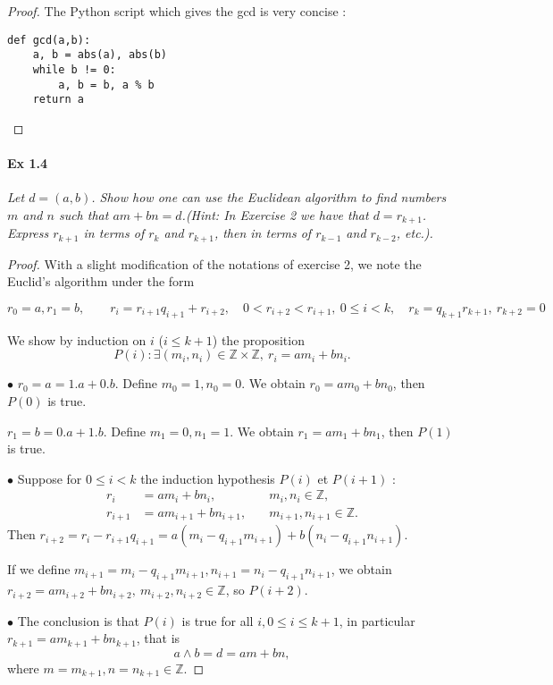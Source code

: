 \documentclass[11pt,a4paper]{article}
\newcommand{\Z}{\mathbb{Z}}
\begin{document}
{\begin{proof}
The Python script which gives the gcd is very concise :
\begin{verbatim}
def gcd(a,b):
    a, b = abs(a), abs(b)
    while b != 0:
        a, b = b, a % b 
    return a
\end{verbatim}
\end{proof}

\paragraph {  Ex 1.4} 

{\it Let $d = (a, b)$. Show how one can use the Euclidean algorithm to find numbers $m$ and $n$ such that $am + bn = d$.(Hint: In Exercise 2 we have that $d = r_{k+1}$. Express $r_{k+1}$ in terms of $r_k$ and $r_{k+1}$, then in terms of $r_{k-1}$ and $r_{k-2}$, etc.).
}
\begin{proof}
With a slight modification of the notations of exercise 2, we note the Euclid's algorithm under the form

$$r_0 = a, r_1 = b, \qquad r_i = r_{i+1} q_{i+1} + r_{i+2} , \quad 0 <  r_{i+2} < r_{i+1},\ 0 \leq i < k, \quad r_k =q_{k+1}r_{k+1},\ r_{k+2} = 0$$

We show by induction on $i$ ($i\leq k + 1$) the proposition
$$P(i)  :  \exists (m_i, n_i) \in \Z \times \Z,\  r_i = am_i +b n_i.$$

$\bullet$ $r_0 = a = 1.a + 0 .b$. Define $m_0 = 1, n_0 = 0$. We obtain $r_0 = a m_0 +b n_0$,  then $P(0)$ is true.

$r_1 = b = 0.a + 1 .b$. Define $m_1 = 0, n_1 = 1$. We obtain $r_1 = a m_1 +b n_1$,  then $P(1)$ is true.

$\bullet$ Suppose for $0\leq i<k$ the induction hypothesis $P(i)$ et $P(i+1)$ :
\begin{align*}
r_i &= am_i +b n_i ,\quad &m_i,n_i \in \mathbb{Z},\\
r_{i+1} &= am_{i+1} + b n_{i+1},\quad  &m_{i+1},n_{i+1} \in \mathbb{Z}.
\end{align*}
Then  $r_{i+2} = r_i - r_{i+1} q_{i+1} = a(m_i - q_{i+1} m_{i+1}) + b (n_i - q_{i+1} n_{i+1})$.

If we define $m_{i+1} = m_i - q_{i+1} m_{i+1}, n_{i+1} = n_i - q_{i+1} n_{i+1}$, we obtain  $r_{i+2} = am_{i+2} + b n_{i+2} ,\ m_{i+2}, n_{i+2} \in \Z$, so $P(i+2)$.

$\bullet$ The conclusion is that  $P(i)$ is true for all $i, 0 \leq i \leq k+1$, in particular $r_{k+1} = a m_{k+1} + b n_{k+1}$, that is 
$$a\wedge b = d = am+b n,$$
where $m = m_{k+1}, n = n_{k+1} \in \Z$.
\end{proof}

}
\end{document}
